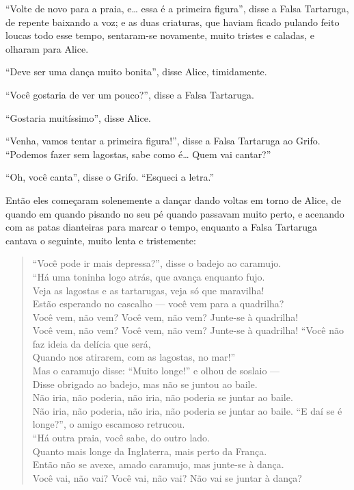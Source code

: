 ``Volte de novo para a praia, e\ldots{} essa é a primeira figura'', disse a
Falsa Tartaruga, de repente baixando a voz; e as duas criaturas, que
haviam ficado pulando feito loucas todo esse tempo, sentaram-se
novamente, muito tristes e caladas, e olharam para Alice.

``Deve ser uma dança muito bonita'', disse Alice, timidamente.

``Você gostaria de ver um pouco?'', disse a Falsa Tartaruga.

``Gostaria muitíssimo'', disse Alice.

``Venha, vamos tentar a primeira figura!'', disse a Falsa Tartaruga ao
Grifo. ``Podemos fazer sem lagostas, sabe como é\ldots{} Quem vai cantar?''

``Oh, você canta'', disse o Grifo. ``Esqueci a letra.''

Então eles começaram solenemente a dançar dando voltas em torno de
Alice, de quando em quando pisando no seu pé quando passavam muito
perto, e acenando com as patas dianteiras para marcar o tempo, enquanto
a Falsa Tartaruga cantava o seguinte, muito lenta e tristemente:

\begin{quote}
``Você pode ir mais depressa?'', disse o badejo ao caramujo.\\
``Há uma toninha logo atrás, que avança enquanto fujo.\\
Veja as lagostas e as tartarugas, veja só que maravilha!\\
Estão esperando no cascalho --- você vem para a quadrilha?\\
Você vem, não vem? Você vem, não vem? Junte-se à quadrilha!\\
Você vem, não vem? Você vem, não vem? Junte-se à quadrilha!
\medskip
``Você não faz ideia da delícia que será,\\
Quando nos atirarem, com as lagostas, no mar!''\\
Mas o caramujo disse: ``Muito longe!'' e olhou de soslaio ---\\
Disse obrigado ao badejo, mas não se juntou ao baile.\\
Não iria, não poderia, não iria, não poderia se juntar ao baile.\\
Não iria, não poderia, não iria, não poderia se juntar ao baile.
\medskip
``E daí se é longe?'', o amigo escamoso retrucou.\\
``Há outra praia, você sabe, do outro lado.\\
Quanto mais longe da Inglaterra, mais perto da França.\\
Então não se avexe, amado caramujo, mas junte-se à dança.\\
Você vai, não vai? Você vai, não vai? Não vai se juntar à dança?
\end{quote}

